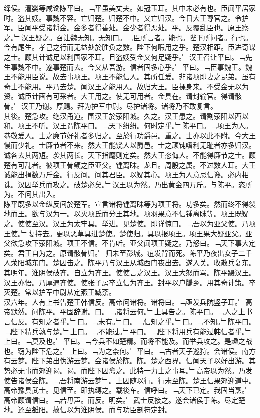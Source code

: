 \documentclass{zhvt-classic}
\begin{document}
\hspace*{2em}绛侯。灌婴等咸谗陈平曰。﹁平虽美丈夫。如冠玉耳。其中未必有也。臣闻平居家时。盗其嫂。事魏不容。亡归楚。归楚不中。又亡归汉。今日大王尊官之。令护军。臣闻平受诸将金。金多者得善处。金少者得恶处。平。反覆乱臣也。原王察之。﹂汉王疑之。召让魏无知。无知曰。﹁臣所言者。能也。陛下所问者。行也。今有尾生。孝己之行而无益处於胜负之数。陛下何暇用之乎。楚汉相距。臣进奇谋之士。顾其计诚足以利国家不耳。且盗嫂受金又何足疑乎。﹂汉王召让平曰。﹁先生事魏不中。遂事楚而去。今又从吾游。信者固多心乎。﹂平曰。﹁臣事魏王。魏王不能用臣说。故去事项王。项王不能信人。其所任爱。非诸项即妻之昆弟。虽有奇士不能用。平乃去楚。闻汉王之能用人。故归大王。臣裸身来。不受金无以为资。诚臣计画有可采者。大王用之。使无可用者。金具在。请封输官。得请骸骨。﹂汉王乃谢。厚赐。拜为护军中尉。尽护诸将。诸将乃不敢复言。\\
\hspace*{2em}其後。楚急攻。绝汉甬道。围汉王於荥阳城。久之。汉王患之。请割荥阳以西以和。项王不听。汉王谓陈平曰。﹁天下纷纷。何时定乎。﹂陈平曰。﹁项王为人。恭敬爱人。士之廉节好礼者多归之。至於行功爵邑。重之。士亦以此不附。今大王慢而少礼。士廉节者不来。然大王能饶人以爵邑。士之顽钝嗜利无耻者亦多归汉。诚各去其两短。袭其两长。天下指麾则定矣。然大王恣侮人。不能得廉节之士。顾楚有可乱者。彼项王骨鲠之臣亚父。锺离眜。龙且。周殷之属。不过数人耳。大王诚能出捐数万斤金。行反间。间其君臣。以疑其心。项王为人意忌信谗。必内相诛。汉因举兵而攻之。破楚必矣。﹂汉王以为然。乃出黄金四万斤。与陈平。恣所为。不问其出入。\\
\hspace*{2em}陈平既多以金纵反间於楚军。宣言诸将锺离眛等为项王将。功多矣。然而终不得裂地而王。欲与汉为一。以灭项氏而分王其地。项羽果意不信锺离眜等。项王既疑之。使使至汉。汉王为太牢具。举进。见楚使。即详惊曰。﹁吾以为亚父使。乃项王使。﹂复持去。更以恶草具进楚使。楚使归。具以报项王。项王果大疑亚父。亚父欲急攻下荥阳城。项王不信。不肯听。亚父闻项王疑之。乃怒曰。﹁天下事大定矣。君王自为之。原请骸骨归。﹂归未至彭城。疽发背而死。陈平乃夜出女子二千人荥阳城东门。楚因击之。陈平乃与汉王从城西门夜出去。遂入关。收散兵复东。\\
\hspace*{2em}其明年。淮阴侯破齐。自立为齐王。使使言之汉王。汉王大怒而骂。陈平蹑汉王。汉王亦悟。乃厚遇齐使。使张子房卒立信为齐王。封平以户牖乡。用其奇计策。卒灭楚。常以护军中尉从定燕王臧荼。\\
\hspace*{2em}汉六年。人有上书告楚王韩信反。高帝问诸将。诸将曰。﹁亟发兵阬竖子耳。﹂高帝默然。问陈平。平固辞谢。曰。﹁诸将云何。﹂上具告之。陈平曰。﹁人之上书言信反。有知之者乎。﹂曰。﹁未有。﹂曰。﹁信知之乎。﹂曰。﹁不知。﹂陈平曰。﹁陛下精兵孰与楚。﹂上曰。﹁不能过。﹂平曰。﹁陛下将用兵有能过韩信者乎。﹂上曰。﹁莫及也。﹂平曰。﹁今兵不如楚精。而将不能及。而举兵攻之。是趣之战也。窃为陛下危之。﹂上曰。﹁为之柰何。﹂平曰。﹁古者天子巡狩。会诸侯。南方有云梦。陛下弟出伪游云梦。会诸侯於陈。陈。楚之西界。信闻天子以好出游。其势必无事而郊迎谒。谒。而陛下因禽之。此特一力士之事耳。﹂高帝以为然。乃发使告诸侯会陈。﹁吾将南游云梦﹂。上因随以行。行未至陈。楚王信果郊迎道中。高帝豫具武士。见信至。即执缚之。载後车。信呼曰。﹁天下已定。我固当烹。﹂高帝顾谓信曰。﹁若毋声。而反。明矣。﹂武士反接之。遂会诸侯于陈。尽定楚地。还至雒阳。赦信以为淮阴侯。而与功臣剖符定封。\\
\end{document}
